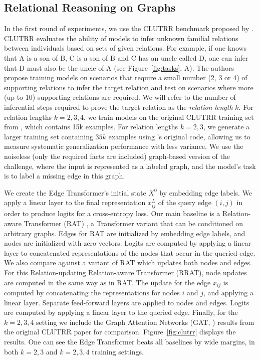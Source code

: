 \documentclass{article}
\begin{document}
\subsection{Relational Reasoning on Graphs} 
In the first round of experiments, we use the CLUTRR benchmark
proposed by \cite{sinha_clutrr_2019}. CLUTRR  evaluates the 
ability of
models to infer unknown familial relations between individuals 
based on sets of given relations. For example, if one knows that A
is a son of B, C is a son of B and C has an uncle called D, one can
infer that D must also be the uncle of A (see Figure~\ref{fig:tasks},
A). The authors propose training models on scenarios that
require a small number (2, 3 or 4) of supporting relations to infer
the target relation and test on scenarios where more (up to 10)
supporting relations are required. We will refer to the number of
inferential steps required to prove the target relation as the
\textit{relation length} $k$. For relation lengths $k=2,3,4$, we train models on the original CLUTRR
training set from \citet{sinha_clutrr_2019}, which contains 15k examples. For relation lengths $k=2,3$, we generate a larger training set containing $35k$ examples using \citet{sinha_clutrr_2019}'s original code, allowing us to measure systematic generalization performance with less variance. 
We use the noiseless (only the required facts are included)
graph-based version of the challenge, where the input is represented
as a labeled graph, and the model's task is to label a missing edge in
this graph. 

We create the Edge Transformer's initial state $X^0$ by embedding edge
labels. We apply a linear layer to the final representation $x^L_{ij}$
of the query edge $(i, j)$ in order to produce logits for a
cross-entropy loss. Our main baseline is a Relation-aware Transformer (RAT)
\citep[RT;][]{shaw_self-attention_2018}, a Transformer variant that
can be conditioned on arbitrary graphs. Edges for RAT are initialized
by embedding edge labels, and nodes are initialized with zero
vectors. Logits are computed by applying a linear layer to
concatenated representations of the nodes that occur in the queried
edge.  We also compare against a variant of RAT which updates both nodes and edges. For this
Relation-updating Relation-aware Transformer (RRAT), node updates are
computed in the same way as in RAT. The update for the edge $x_{ij}$
is computed by concatenating the representations for nodes $i$ and
$j$, and applying a linear layer. Separate feed-forward layers are
applied to nodes and edges. Logits are computed by applying a linear layer to the queried edge.
Finally, for the $k=2,3,4$ setting we include the Graph Attention Networks (GAT,
\citet{velickovic_graph_2018}) results from the original CLUTRR paper
for comparison.
Figure~\ref{fig:clutrr} displays the results. One can see the Edge
Transformer beats all baselines by wide margins, in both $k=2,3$
and $k=2,3,4$ training settings.
\end{document}
